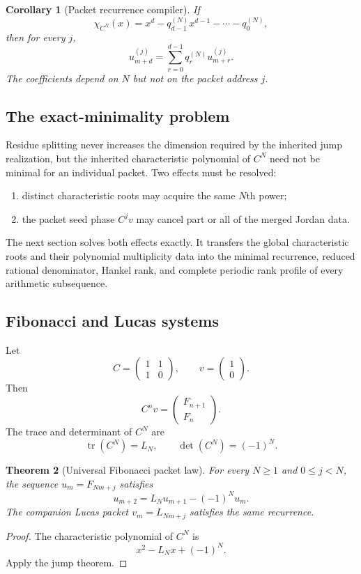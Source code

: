 \documentclass[11pt]{article}
\newtheorem{theorem}{Theorem}[section]\newtheorem{proposition}[theorem]{Proposition}\newtheorem{lemma}[theorem]{Lemma}\newtheorem{corollary}[theorem]{Corollary}
\theoremstyle{definition}\newtheorem{definition}[theorem]{Definition}\newtheorem{example}[theorem]{Example}\newtheorem{construction}[theorem]{Construction}\newtheorem{algorithm}[theorem]{Algorithm}\newtheorem{conjecture}[theorem]{Conjecture}\newtheorem{problem}[theorem]{Problem}
\theoremstyle{remark}\newtheorem{remark}[theorem]{Remark}\newtheorem{boundary}[theorem]{Boundary}\newtheorem{certificate}[theorem]{Computational Certificate}\newtheorem{classical}[theorem]{Classical Input}\newtheorem{principle}[theorem]{Structural Principle}
\begin{document}
\begin{corollary}[Packet recurrence compiler]
If
\[
 \chi_{C^N}(x)=x^d-q_{d-1}^{(N)}x^{d-1}-\cdots-q_0^{(N)},
\]
then for every $j$,
\[
 u_{m+d}^{(j)}=\sum_{r=0}^{d-1}q_r^{(N)}u_{m+r}^{(j)}.
\]
The coefficients depend on $N$ but not on the packet address $j$.
\end{corollary}

\subsection{The exact-minimality problem}
Residue splitting never increases the dimension required by the inherited jump realization, but the inherited characteristic polynomial of $C^N$ need not be minimal for an individual packet.  Two effects must be resolved:
\begin{enumerate}
\item distinct characteristic roots may acquire the same $N$th power;
\item the packet seed phase $C^jv$ may cancel part or all of the merged Jordan data.
\end{enumerate}
The next section solves both effects exactly.  It transfers the global characteristic roots and their polynomial multiplicity data into the minimal recurrence, reduced rational denominator, Hankel rank, and complete periodic rank profile of every arithmetic subsequence.

\subsection{Fibonacci and Lucas systems}
Let
\[
 C=\begin{pmatrix}1&1\\1&0\end{pmatrix},\qquad
 v=\begin{pmatrix}1\\0\end{pmatrix}.
\]
Then
\[
 C^n v=\begin{pmatrix}F_{n+1}\\F_n\end{pmatrix}.
\]
The trace and determinant of $C^N$ are
\[
 \operatorname{tr}(C^N)=L_N,\qquad \det(C^N)=(-1)^N.
\]

\begin{theorem}[Universal Fibonacci packet law]
For every $N\geq1$ and $0\leq j<N$, the sequence $u_m=F_{Nm+j}$ satisfies
\[
 \boxed{u_{m+2}=L_Nu_{m+1}-(-1)^Nu_m.}
\]
The companion Lucas packet $v_m=L_{Nm+j}$ satisfies the same recurrence.
\end{theorem}
\begin{proof}
The characteristic polynomial of $C^N$ is
\[
 x^2-L_Nx+(-1)^N.
\]
Apply the jump theorem.
\end{proof}
\end{document}
